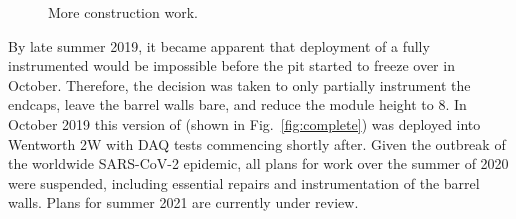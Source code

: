 \begin{figure} %
    \centering
    \quad
    \caption[More \chipsfive construction work]
    {More \chipsfive construction work.}
    \label{fig:work2}
\end{figure}

By late summer 2019, it became apparent that deployment of a fully instrumented \chipsfive would
be impossible before the pit started to freeze over in October. Therefore, the decision was taken
to only partially instrument the endcaps, leave the barrel walls bare, and reduce the module
height to \unit{8}{}. In October 2019 this version of \chipsfive (shown in
Fig.~\ref{fig:complete}) was deployed into Wentworth 2W with DAQ tests commencing shortly after.
Given the outbreak of the worldwide SARS-CoV-2 epidemic, all plans for work over the summer of
2020 were suspended, including essential repairs and instrumentation of the barrel walls. Plans
for summer 2021 are currently under review.


